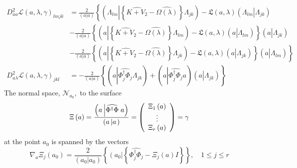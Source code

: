 \documentclass[aps,preprint]{revtex4}%
\begin{document}
\begin{align}
D_{aa}^{2}\mathcal{L}\left(  a,\lambda,\gamma\right)  _{lmjk}  &  =\frac
{2}{\left(  a\left\vert a\right.  \right)  }\left\{  \left(  \Lambda
_{lm}\left\vert \left\{  \widehat{K+V_{2}}-\widehat{\Omega\left(
\lambda\right)  }\right\}  \right.  \Lambda_{jk}\right)  -\mathfrak{L}\left(
a,\lambda\right)  \left(  \Lambda_{lm}\left\vert \overset{}{\Lambda_{jk}%
}\right.  \right)  \right. \nonumber\\
&  -\frac{2}{\left(  a\left\vert a\right.  \right)  }\left\{  \left(
a\left\vert \left\{  \widehat{K+V_{2}}-\widehat{\Omega\left(  \lambda\right)
}\right\}  \right.  \Lambda_{lm}\right)  -\mathfrak{L}\left(  a,\lambda
\right)  \left(  a\left\vert \overset{}{\Lambda_{lm}}\right.  \right)
\right\}  \left(  a\left\vert \overset{}{\Lambda_{jk}}\right.  \right)
\nonumber\\
&  \left.  -\frac{2}{\left(  a\left\vert a\right.  \right)  }\left\{  \left(
a\left\vert \left\{  \widehat{K+V_{2}}-\widehat{\Omega\left(  \lambda\right)
}\right\}  \right.  \Lambda_{jk}\right)  -\mathfrak{L}\left(  a,\lambda
\right)  \left(  a\left\vert \overset{}{\Lambda_{jk}}\right.  \right)
\right\}  \left(  a\left\vert \overset{}{\Lambda_{lm}}\right.  \right)
\right\} \\
D_{a\lambda}^{2}\mathcal{L}\left(  a,\lambda,\gamma\right)  _{jkl}  &
=-\frac{2}{\left(  a\left\vert a\right.  \right)  }\left\{  \left(
a\left\vert \widehat{\Phi_{j}^{\dagger}\Phi_{j}}\right.  \Lambda_{jk}\right)
+\left(  a\left\vert \widehat{\Phi_{j}^{\dagger}\Phi_{j}}\right.  a\right)
\left(  a\left\vert \overset{}{\Lambda_{jk}}\right.  \right)  \right\}
\end{align}
The normal space, $\mathcal{N}_{a_{0}},$ to the surface
\begin{equation}
\Xi\left(  a\right)  =\frac{\left(  a\left\vert \widehat{\Phi^{\dagger}\Phi
}\right.  a\right)  }{\left(  a\left\vert \overset{}{a}\right.  \right)
}=\left(
\begin{array}
[c]{c}%
\Xi_{1}\left(  a\right) \\
\vdots\\
\Xi_{r}\left(  a\right)
\end{array}
\right)  =\gamma
\end{equation}
at the point $a_{0}$ is spanned by the vectors
\begin{equation}
\nabla_{a}\Xi_{j}\left(  a_{0}\right)  =\frac{2}{\left(  a_{0}\left\vert
a_{0}\right.  \right)  }\left\{  \left(  \overset{}{a_{0}}\right\vert \left\{
\widehat{\Phi_{j}^{\dagger}\Phi_{j}}-\Xi_{j}\left(  a\right)  I\right\}
\right\}  ,\quad1\leq j\leq r
\end{equation}
\end{document}
